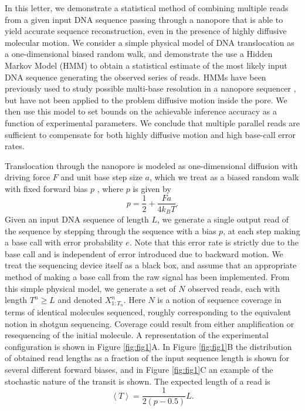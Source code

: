 \documentclass{biophys_letter}
\begin{document}
\begin{multicols}{2}
In this letter, we demonstrate a statistical method of combining multiple reads from a given input DNA sequence passing through a nanopore that is able to yield accurate sequence reconstruction, even in the presence of highly diffusive molecular motion.
We consider a simple physical model of DNA translocation as a one-dimensional biased random walk, and demonstrate the use a Hidden Markov Model (HMM) to obtain a statistical estimate of the most likely input DNA sequence generating the observed series of reads.
HMMs have been previously used to study possible multi-base resolution in a nanopore sequencer \cite{Timp:2012}, but have not been applied to the problem diffusive motion inside the pore.
We then use this model to set bounds on the achievable inference accuracy as a function of experimental parameters.
We conclude that multiple parallel reads are sufficient to compensate for both highly diffusive motion and high base-call error rates.

Translocation through the nanopore is modeled as one-dimensional diffusion with driving force $F$ and unit base step size $a$, which we treat as a biased random walk with fixed forward bias $p$ \cite{Berg:1993}, where $p$ is given by
\begin{equation}
p = \frac{1}{2} + \frac{Fa}{4k_{B}T}.
\end{equation}
Given an input DNA sequence of length $L$, we generate a single output read of the sequence by stepping through the sequence with a bias $p$, at each step making a base call with error probability $e$.
Note that this error rate is strictly due to the base call and is independent of error introduced due to backward motion. 
We treat the sequencing device itself as a black box, and assume that an appropriate method of making a base call from the raw signal has been implemented.
From this simple physical model, we generate a set of $N$ observed reads, each with length $T^{n} \ge L$ and denoted $X^n_{1:T_n}$.
Here $N$ is a notion of sequence coverage in terms of identical molecules sequenced, roughly corresponding to the equivalent notion in shotgun sequencing.
Coverage could result from either amplification or resequencing of the initial molecule.
A representation of the experimental configuration is shown in Figure \ref{fig:fig1}A.
In Figure \ref{fig:fig1}B the distribution of obtained read lengths as a fraction of the input sequence length is shown for several different forward biases, and in Figure \ref{fig:fig1}C an example of the stochastic nature of the transit is shown.
The expected length of a read is 
\begin{equation}
  \left\langle T  \right\rangle = \frac{1}{2(p-0.5)} L.
\end{equation}

\end{multicols}
\end{document}
